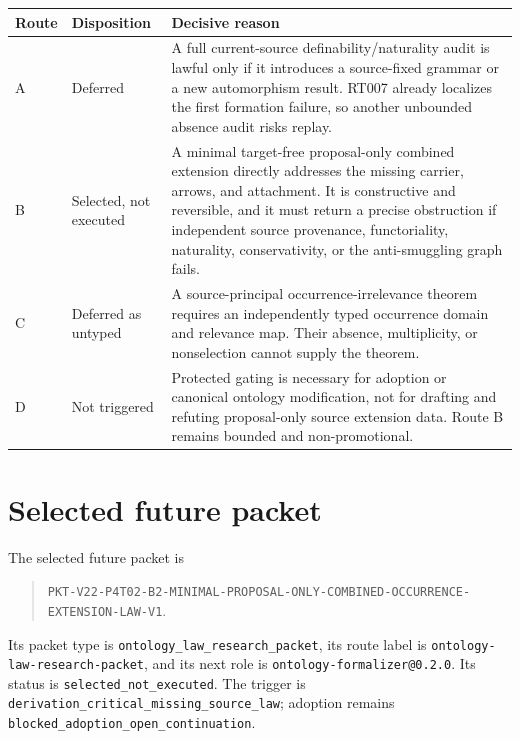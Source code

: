 \documentclass[11pt]{article}
\newcommand{\code}[1]{\nolinkurl{#1}}
\begin{document}
\begin{longtable}{p{}p{}p{}}
\toprule
Route & Disposition & Decisive reason \\
\midrule
\endhead
A & Deferred & A full current-source definability/naturality audit is lawful
only if it introduces a source-fixed grammar or a new automorphism result.
RT007 already localizes the first formation failure, so another unbounded
absence audit risks replay. \\
B & Selected, not executed & A minimal target-free proposal-only combined
extension directly addresses the missing carrier, arrows, and attachment.  It
is constructive and reversible, and it must return a precise obstruction if
independent source provenance, functoriality, naturality, conservativity, or
the anti-smuggling graph fails. \\
C & Deferred as untyped & A source-principal occurrence-irrelevance theorem
requires an independently typed occurrence domain and relevance map.  Their
absence, multiplicity, or nonselection cannot supply the theorem. \\
D & Not triggered & Protected gating is necessary for adoption or canonical
ontology modification, not for drafting and refuting proposal-only source
extension data.  Route B remains bounded and non-promotional. \\
\bottomrule
\end{longtable}

\section{Selected future packet}

The selected future packet is
\begin{quote}
\code{PKT-V22-P4T02-B2-MINIMAL-PROPOSAL-ONLY-COMBINED-OCCURRENCE-EXTENSION-LAW-V1}.
\end{quote}
Its packet type is \code{ontology_law_research_packet}, its route label is
\code{ontology-law-research-packet}, and its next role is
\code{ontology-formalizer@0.2.0}.  Its status is
\code{selected_not_executed}.  The trigger is
\code{derivation_critical_missing_source_law}; adoption remains
\code{blocked_adoption_open_continuation}.
\end{document}
